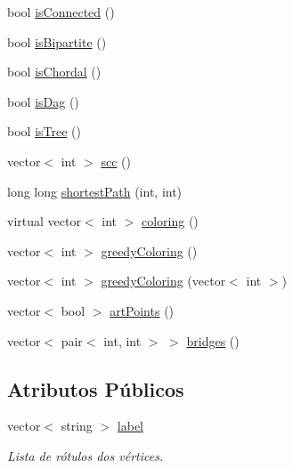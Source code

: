 \begin{DoxyCompactItemize}
bool \hyperlink{classGraphGen_addc27f1b1daa452bb0943c867b550906}{is\+Connected} ()
\item 
bool \hyperlink{classGraphGen_a41afdf97face9260e82749c4c770b2e7}{is\+Bipartite} ()
\item 
bool \hyperlink{classGraphGen_aac3e93061f340c6855aa54ed73922f47}{is\+Chordal} ()
\item 
bool \hyperlink{classGraphGen_ab4923b690b5fe013f35377b849bb6609}{is\+Dag} ()
\item 
bool \hyperlink{classGraphGen_adffd99540a68b2c158cc1b089ccfd550}{is\+Tree} ()
\item 
vector$<$ int $>$ \hyperlink{classGraphGen_a875733956a1f667d68afb420f53ecc86}{scc} ()
\item 
long long \hyperlink{classGraphGen_ad42fcde82e163baadcfaa02293242db5}{shortest\+Path} (int, int)
\item 
virtual vector$<$ int $>$ \hyperlink{classGraphGen_ad44c80646f694460fafa3e3657beb4d0}{coloring} ()
\item 
vector$<$ int $>$ \hyperlink{classGraphGen_a8505ba4cbaa0685f43e52a4c4f296dc1}{greedy\+Coloring} ()
\item 
vector$<$ int $>$ \hyperlink{classGraphGen_a0690c98ce5c9dd544074f690fb79a8c6}{greedy\+Coloring} (vector$<$ int $>$)
\item 
vector$<$ bool $>$ \hyperlink{classGraphGen_abfc9e2946585f5ea7e2948cd724d37e8}{art\+Points} ()
\item 
vector$<$ pair$<$ int, int $>$ $>$ \hyperlink{classGraphGen_ac80b65f7234db5bc163c7736aa0f561a}{bridges} ()
\end{DoxyCompactItemize}
\subsection*{Atributos Públicos}
\begin{DoxyCompactItemize}
\item 
\mbox{\label{classGraphGen_a59a950a3a5b8d5f3bda7b544a83248ed}} 
vector$<$ string $>$ \hyperlink{classGraphGen_a59a950a3a5b8d5f3bda7b544a83248ed}{label}
\begin{DoxyCompactList}\small\item\em Lista de rótulos dos vértices. \end{DoxyCompactList}\end{DoxyCompactItemize}
